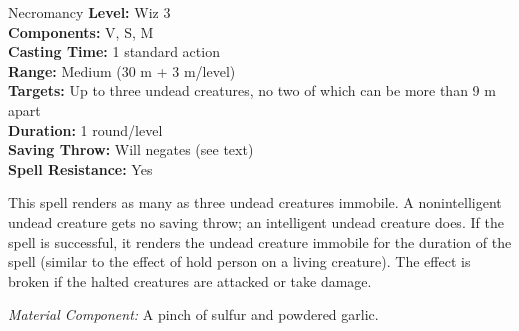{Necromancy}
{
	\textbf{Level:}
	Wiz 3\\
	\textbf{Components:}
	V, S, M\\
	\textbf{Casting Time:}
	1 standard action\\
	\textbf{Range:}
	Medium (30 m + 3 m/level)\\
	\textbf{Targets:}
	Up to three undead creatures, no two of which can be more than 9 m apart\\
	\textbf{Duration:}
	1 round/level\\
	\textbf{Saving Throw:}
	Will negates (see text)\\
	\textbf{Spell Resistance:}
	Yes\\
}
{
	This spell renders as many as three undead creatures immobile. A nonintelligent undead creature gets no saving throw; an intelligent undead creature does. If the spell is successful, it renders the undead creature immobile for the duration of the spell (similar to the effect of hold person on a living creature). The effect is broken if the halted creatures are attacked or take damage.

	\textit{Material Component:}
	A pinch of sulfur and powdered garlic.

}

